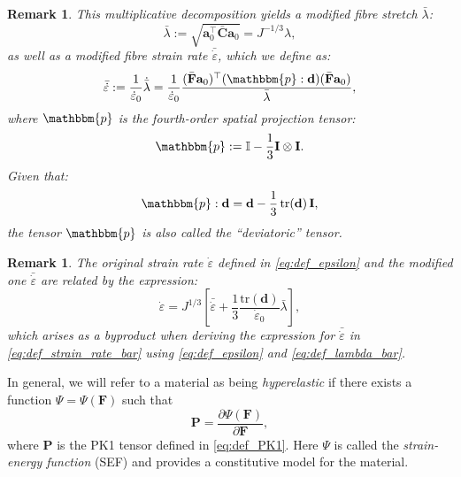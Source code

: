 \documentclass{sfuthesis}
\numberwithin{equation}{section}
\numberwithin{figure}{chapter}
\numberwithin{table}{chapter}
\newtheorem{remark}[theorem]{Remark}
\theoremstyle{definition}
\def\*#1{{\mathbf{#1}}} %
\newcommand{\pder}[2]{\dfrac{\partial #1}{\partial #2}}
\newcommand{\depsilon}{\dot{\varepsilon}}
\newcommand{\T}{\top}
\newcommand{\p}{\mathbbm{p}}
\begin{document}
\begin{remark}
    This multiplicative decomposition yields a \textit{modified fibre stretch} $\bar{\lambda}$:
    \begin{equation} \label{eq:def_lambda_bar}
    \bar{\lambda} := \sqrt{\*a_0^\T \bar{\*C} \*a_0} = J^{-1/3} \lambda,
    \end{equation}
    as well as a \textit{modified fibre strain rate} $\bar{\depsilon}$, which we define as:
    \begin{equation} \label{eq:def_strain_rate_bar}
    \bar{\depsilon} := \dfrac{1}{\depsilon_0} \dot{\bar{\lambda}} = \dfrac{1}{\depsilon_0} \dfrac{(\bar{\*F}\*a_0)^\T (\p : \*d) (\bar{\*F} \*a_0)}{\bar{\lambda}},
    \end{equation}
    where $\p$ is the fourth-order \textit{spatial projection tensor}:
    \begin{equation} \label{eq:def_projection_spatial}
    \p := \mathbb{I} - \dfrac{1}{3} \*I \otimes \*I.
    \end{equation}
    Given that:
    \begin{equation}
        \p : \*d = \*d - \dfrac{1}{3} \, \mathrm{tr}(\*d) \, \*I,
    \end{equation}
    the tensor $\p$ is also called the ``deviatoric'' tensor.
\end{remark}

\begin{remark}
    The original strain rate $\depsilon$ defined in \eqref{eq:def_epsilon} and the modified one $\bar{\depsilon}$ are related by the expression:
    \begin{equation}
        \depsilon = J^{1/3} \left[ \bar{\depsilon} + \dfrac{1}{3} \dfrac{\mathrm{tr}(\*d)}{\depsilon_0} \bar{\lambda} \right],
    \end{equation}
    which arises as a byproduct when deriving the expression for $\bar{\depsilon}$ in \eqref{eq:def_strain_rate_bar} using \eqref{eq:def_epsilon} and \eqref{eq:def_lambda_bar}.
\end{remark}


In general, we will refer to a material as being \textit{hyperelastic} if there exists a function $\Psi = \Psi(\*F)$ such that
\begin{equation}
    \*P = \pder{\Psi(\*F)}{\*F},
\end{equation}
where $\*P$ is the PK1 tensor defined in \eqref{eq:def_PK1}. Here $\Psi$ is called the \textit{strain-energy function} (SEF) and provides a constitutive model for the material.
\end{document}
